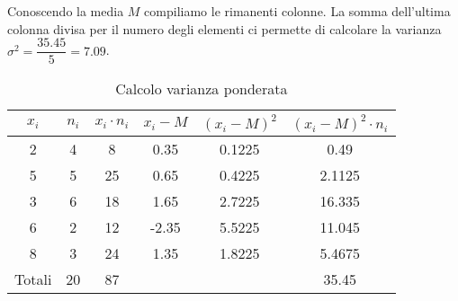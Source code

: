 Conoscendo la media $M$  compiliamo le rimanenti colonne. La somma dell'ultima colonna divisa per il numero degli elementi ci permette di  calcolare la varianza $\sigma^2=\dfrac{\num{35.45}}{5}=\num{7.09}$.
\begin{table}
	\centering
	\begin{tabular}{S[table-format=1.0]S[table-format=2.0]S[table-format=2.0]S[table-format=1.2]S[table-format=1.4]S[table-format=2.4] }
		\toprule
	{$x_i$}	&{$n_i$}  & {$x_i\cdot n_i$} & {$x_i-M$} & {$(x_i-M )^2$} & {$(x_i-M)^2\cdot n_i $ } \\
			& 4 & 8  & 0.35 &0.1225  & 0.49 \\ 
		5	& 5 & 25 & 0.65 &0.4225  & 2.1125 \\ 
		3	& 6 & 18 & 1.65 &2.7225  & 16.335 \\ 
		6	& 2 & 12 & -2.35&5.5225  & 11.045 \\ 
		8	& 3 & 24 & 1.35 &1.8225  & 5.4675 \\
		\midrule 
	{Totali}& 20& 87 &  &  & 35.45 \\
		\bottomrule 
	\end{tabular} 
	\caption{Calcolo varianza ponderata}
	\label{tab:CalcoloVarianzaPonderata}
\end{table}


